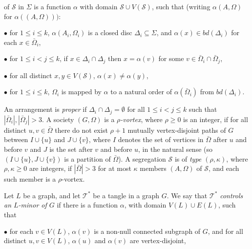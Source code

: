 \noindent of $\mathscr{S}$ in $\Sigma$ is a function $\alpha$ with domain $\mathscr{S} \cup V(\mathscr{S})$, such that (writing $\alpha(A, \Omega)$ for $\alpha((A, \Omega)))$:

\hspace*{12pt}$\bullet$ for $1 \le i \le k$, $\alpha(A_i, \Omega_i)$ is a closed disc $\Delta_i \subseteq \Sigma$, and $\alpha(x) \in bd(\Delta_i)$ for each $x \in \bar{\Omega}_i$,

\hspace*{12pt}$\bullet$ for $1 \le i < j \le k$, if $x \in \Delta_i \cap \Delta_j$ then $x = \alpha(v)$ for some $v \in \bar{\Omega}_i \cap \bar{\Omega}_j$,

\hspace*{12pt}$\bullet$ for all distinct $x, y \in V(\mathscr{S})$, $\alpha(x) \ne \alpha(y)$,

\hspace*{12pt}$\bullet$ for $1 \le i \le k$, $\Omega_i$ is mapped by $\alpha$ to a natural order of $\alpha(\bar{\Omega}_i)$ from $bd(\Delta_i)$.

An arrangement is \textit{proper} if $\Delta_i \cap \Delta_j = \emptyset$ for all $1 \le i < j \le k$ such that $|\bar{\Omega}_i|, |\bar{\Omega}_j| > 3$. A society $(G, \Omega)$ is a \textit{$\rho$-vortex}, where $\rho \ge 0$ is an integer, if for all distinct $u, v \in \bar{\Omega}$ there do not exist $\rho + 1$ mutually vertex-disjoint paths of $G$ between $I \cup \{u\}$ and $J \cup \{v\}$, where $I$ denotes the set of vertices in $\bar{\Omega}$ after $u$ and before $v$ and $J$ is the set after $v$ and before $u$, in the natural sense (so $(I \cup \{u\}, J \cup \{v\})$ is a partition of $\bar{\Omega}$). A segregation $\mathscr{S}$ is of \textit{type $(\rho, \kappa)$}, where $\rho, \kappa \ge 0$ are integers, if $|\bar{\Omega}| > 3$ for at most $\kappa$ members $(A, \Omega)$ of $\mathscr{S}$, and each such member is a $\rho$-vortex.

Let $L$ be a graph, and let $\mathscr{T}^*$ be a tangle in a graph $G$. We say that $\mathscr{T}^*$ \textit{controls an $L$-minor of $G$} if there is a function $\alpha$, with domain $V(L) \cup E(L)$, such that

\hspace*{12pt}$\bullet$ for each $v \in V(L)$, $\alpha(v)$ is a non-null connected subgraph of $G$, and for all distinct $u, v \in V(L)$, $\alpha(u)$ and $\alpha(v)$ are vertex-disjoint,

